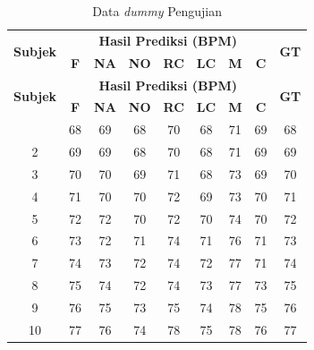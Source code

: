 \begin{longtable}{|c|c|c|c|c|c|c|c|c|}
	\caption{Data \textit{dummy} Pengujian}
	\label{table:3.dummy}\\
	\hline
	\multirow{2}{*}{\textbf{Subjek}} & \multicolumn{7}{|c|}{\textbf{Hasil Prediksi (BPM)}} & \multirow{2}{*}{\textbf{GT}} \\ \cline{2-8}
    & \textbf{F} & \textbf{NA} & \textbf{NO} & \textbf{RC} & \textbf{LC} & \textbf{M} & \textbf{C} & \\ 
        \hline
	   \endfirsthead
       \hline
       \multirow{2}{*}{\textbf{Subjek}} & \multicolumn{7}{|c|}{\textbf{Hasil Prediksi (BPM)}} & \multirow{2}{*}{\textbf{GT}} \\ \cline{2-8}
    & \textbf{F} & \textbf{NA} & \textbf{NO} & \textbf{RC} & \textbf{LC} & \textbf{M} & \textbf{C} & \\ 
    \hline
	\endhead
	\hline
	\endfoot
	\hline
	\endlastfoot
	1 & 68 & 69 & 68 & 70 & 68 & 71 & 69 & 68 \\ 
	\hline
	2 & 69 & 69 & 68 & 70 & 68 & 71 & 69 & 69 \\
	\hline
	3 & 70 & 70 & 69 & 71 & 68 & 73 & 69 & 70\\
	\hline
	4 & 71 & 70 & 70 & 72 & 69 & 73 & 70 & 71 \\
	\hline
	5 & 72 & 72 & 70 & 72 & 70 & 74 & 70 & 72 \\
	\hline
        6 & 73 & 72 & 71 & 74 & 71 & 76 & 71 & 73 \\ 
	\hline
	7 & 74 & 73 & 72 & 74 & 72 & 77 & 71 & 74 \\
	\hline
	8 & 75 & 74 & 72 & 74 & 73 & 77 & 73 & 75\\
	\hline
	9 & 76 & 75 & 73 & 75 & 74 & 78 & 75 & 76 \\
	\hline
	10 & 77 & 76 & 74 & 78 & 75 & 78 & 76 & 77
\end{longtable}